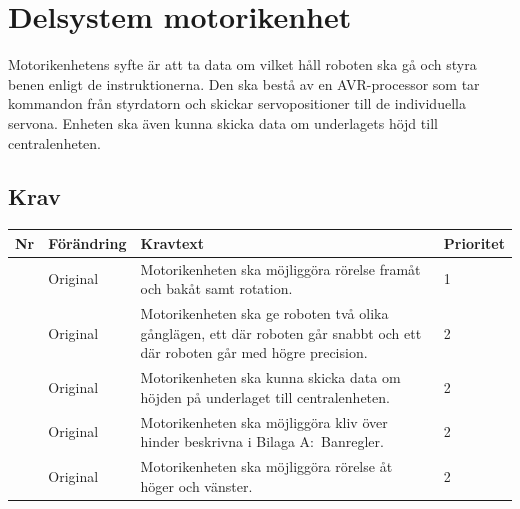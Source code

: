 \documentclass[a4paper,titlepage,12pt]{article}
\newcounter{reqNr}
\newcommand{\nextReqNr}{\stepcounter{reqNr}\arabic{reqNr}}
\begin{document}

	\section{Delsystem motorikenhet}
	Motorikenhetens syfte är att ta data om vilket håll roboten ska gå och styra benen enligt de
	instruktionerna. Den ska bestå av en AVR-processor som tar kommandon från styrdatorn och skickar
	servopositioner till de individuella servona. Enheten ska även kunna skicka data om underlagets
	höjd till centralenheten.

	\subsection{Krav}
	\begin{table}[h]
		\begin{tabularx}{\textwidth}{c l X l}
			\textbf{Nr} & \textbf{Förändring} & \textbf{Kravtext} & \textbf{Prioritet} 
				\\ \midrule

			\nextReqNr{} & Original & Motorikenheten ska möjliggöra rörelse framåt och 
				bakåt samt rotation. & 1
				\\ \midrule

			\nextReqNr{} & Original & Motorikenheten ska ge roboten två olika gånglägen,
				ett där roboten går 
				snabbt och ett där roboten går med högre precision.& 2
				\\ \midrule

			\nextReqNr{} & Original & Motorikenheten ska kunna skicka data om höjden 
				på underlaget till centralenheten. & 2
				\\ \midrule

			\nextReqNr{} & Original & Motorikenheten ska möjliggöra kliv över hinder 
				beskrivna i Bilaga A:\
  				Banregler. & 2
				\\ \midrule

			\nextReqNr{} & Original & Motorikenheten ska möjliggöra rörelse åt höger 
				och vänster. & 2 

		\end{tabularx}
	\end{table}


\end{document}
